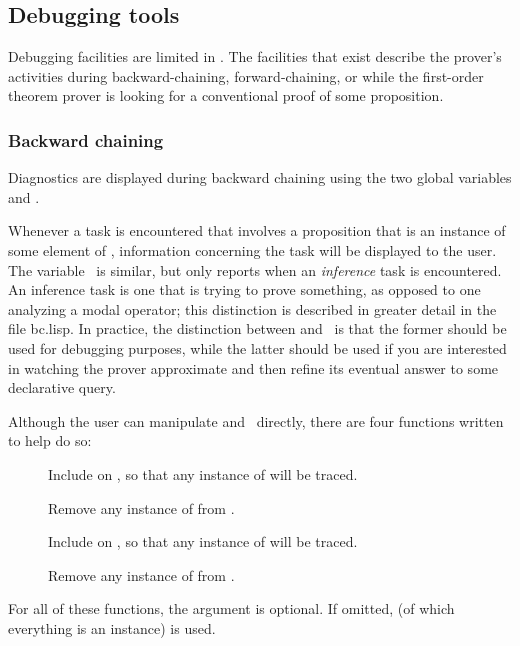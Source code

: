 \subsection{Debugging tools}

Debugging facilities are limited in \mvl.  The facilities that exist
describe the prover's activities during backward-chaining,
forward-chaining, or while the first-order theorem prover is looking
for a conventional proof of some proposition.

\subsubsection{Backward chaining}

Diagnostics are displayed during backward chaining using the two
global variables  and \at{}.

Whenever a task is encountered that involves a proposition that is an
instance of some element of , information concerning
the task will be displayed to the user.  The variable \at\ is
similar, but only reports when an {\em inference\/} task is
encountered.  An inference task is one that is trying to prove
something, as opposed to one analyzing a modal operator; this
distinction is described in greater detail in the file {\type
bc.lisp}.  In practice, the distinction between  and
\at\ is that the former should be used for debugging purposes, while
the latter should be used if you are interested in watching the
prover approximate and then refine its eventual answer to some
declarative query.

Although the user can manipulate  and \at\ directly,
there are four functions written to help do so:
 \begin{description}
 \item [] Include  on
, so that any instance of  will be
traced.
 \item [] Remove any instance of 
from .
 \item [] Include  on \at, so
that any instance of  will be traced.
 \item [] Remove any instance of
 from \at.
 \end{description}
 For all of these functions, the argument is optional.  If omitted,
 (of which everything is an instance) is used.

